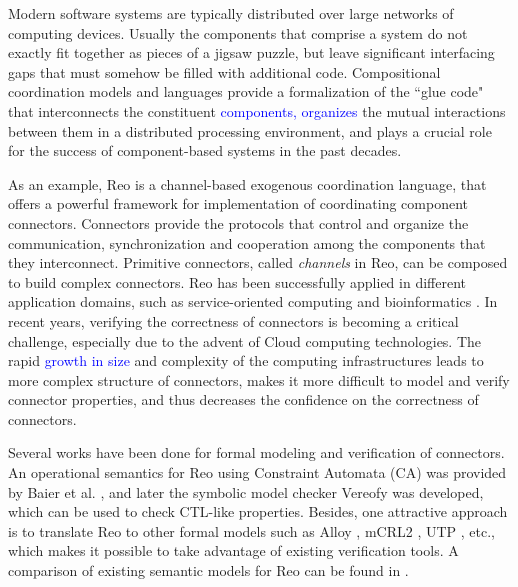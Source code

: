\documentclass[preprint,3p]{elsarticle}
\newcommand{\liyi}[1]{\textcolor{blue}{#1}}
\newcommand{\xy}[1]{{#1}}
\begin{document}
Modern software systems are typically distributed over large networks of \xy{computing devices.} \xy{Usually the components}
that comprise a system do not exactly fit together as pieces of a jigsaw puzzle, but leave significant interfacing gaps
that must somehow be filled with additional code. Compositional coordination models and languages provide a formalization
of the ``glue code" that interconnects the constituent \liyi{components, organizes} the mutual interactions \xy{between them} in a
distributed processing environment, and \xy{plays} a crucial role for the success of component-based systems in the past decades.

As an example,  \xy{Reo \cite{Arb04} is a channel-based exogenous coordination language, that offers
a powerful framework for implementation of coordinating component connectors.} Connectors provide the protocols that control and organize
the communication, synchronization and cooperation among the components that they interconnect. Primitive connectors, called {\em channels}
in Reo, can be composed to build complex connectors. Reo has been successfully applied in different application domains, such as
service-oriented computing and bioinformatics \cite{CCA04, SA07}. \xy{In recent years,
verifying the correctness of connectors is becoming a critical challenge, especially due to the advent of Cloud computing
technologies. The rapid \liyi{growth in size} and complexity of the computing infrastructures leads to more complex structure of connectors, makes it more difficult to model
and verify connector properties, and thus decreases the confidence on the correctness of connectors.}


Several works have been done for formal modeling and \xy{verification of connectors.} An operational semantics for Reo using Constraint Automata
(CA) was provided by Baier et al. \cite{BSAR06}, and later the symbolic model checker Vereofy \cite{BBK+10} was developed,
which can be used to check CTL-like properties.
Besides, one attractive approach is \xy{to translate Reo} to other formal models such as Alloy
\cite{KSA+08}, mCRL2 \cite{KKV12}, UTP \cite{AAA+09,SAA+12}, etc.,
which makes it possible to take advantage of existing verification
tools. A comparison of existing semantic models for Reo can be found
in \cite{JA12}.
\end{document}
